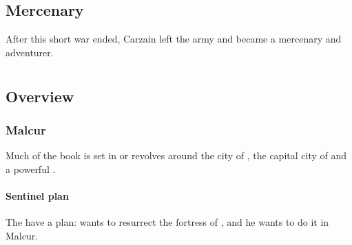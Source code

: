 \begin{garbage}
\section{Mercenary}
After this short war ended, Carzain left the army and became a mercenary and adventurer. 

























\chapter{\TwilightAngelRemember}
\target{\TwilightAngelRemember}

















\section{Overview}

\begin{comment}

\end{comment}









\subsection{Malcur}
Much of the book is set in or revolves around the city of , the capital city of  and a powerful \hs{\nexus}.





\subsubsection{Sentinel plan}
The  have a plan: \hs{\Secherdamon} wants to resurrect the \draconic{} fortress of \hs{\Nithdornazsh}, and he wants to do it in Malcur. 


\end{garbage}
